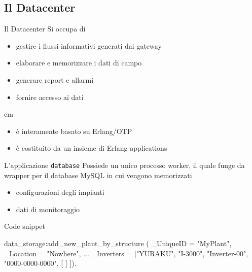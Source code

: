 \documentclass{beamer}
\newcommand{\N}{\vskip 0.3 cm}
\newcommand{\red}[1]{\textcolor[rgb]{.8,0,0}{#1}}
\newcommand{\green}[1]{\textcolor[rgb]{0,.6,.1}{#1}}
\begin{document}
%
\subsection{Il Datacenter}
%
\begin{frame}{Il Datacenter}
Si occupa di
\begin{itemize}
\item \green{gestire i flussi informativi} generati dai gateway
\item \green{elaborare} e \green{memorizzare} i dati di campo 
\item generare \green{report} e \green{allarmi}
\item fornire \green{accesso ai dati}
\end{itemize}
%
\N
\begin{itemize}
  \item \`e interamente basato su \red{Erlang/OTP}
  \item \`e costituito da un insieme di \red{Erlang applications}
\end{itemize}
%
\begin{figure}[!h]
  \begin{center}
  \end{center}
\end{figure}
%
\end{frame}
%

%
\begin{frame}[fragile]{L'applicazione \texttt{database}}
  Possiede un unico processo \green{worker}, il quale 
  funge da wrapper per il database \red{MySQL} in cui vengono memorizzati
  \begin{itemize}
  \item configurazioni degli impianti
  \item dati di monitoraggio
  \end{itemize}
\begin{exampleblock}{Code snippet}
\begin{semiverbatim}
data_storage:\red{add_new_plant_by_structure} (
      \green{_UniqueID} = "MyPlant", 
      \green{_Location} = "Nowhere",
      ...
      \green{_Inverters} = [{{"YURAKU", "I-3000"}, 
                    "Inverter-00", "0000-0000-0000", 
                    [%
                     ]} ]).
\end{semiverbatim}
\end{exampleblock}  
\end{frame}
%
\end{document}
